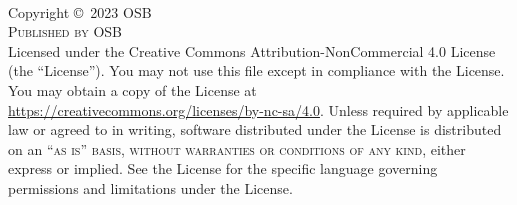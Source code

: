 \documentclass[
	11pt, %
	fleqn, %
	a4paper, %
]{osb}
\begin{document}

% 

\thispagestyle{empty} %

~\vfill %

\noindent Copyright \copyright\ 2023 OSB\\ %

\noindent \textsc{Published by OSB}\\ %


\noindent Licensed under the Creative Commons Attribution-NonCommercial 4.0 License (the ``License''). You may not use this file except in compliance with the License. You may obtain a copy of the License at \url{https://creativecommons.org/licenses/by-nc-sa/4.0}. Unless required by applicable law or agreed to in writing, software distributed under the License is distributed on an \textsc{``as is'' basis, without warranties or conditions of any kind}, either express or implied. See the License for the specific language governing permissions and limitations under the License.\\ %
\end{document}
